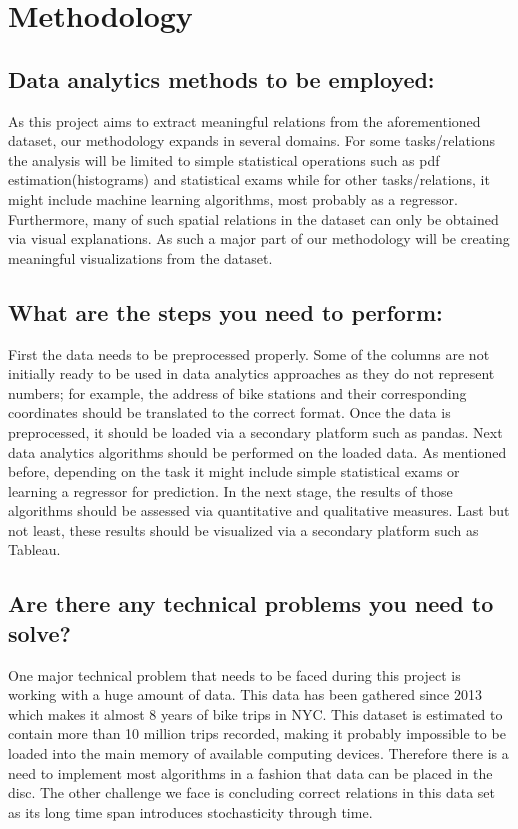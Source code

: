 \documentclass[sigconf,authordraft]{acmart}
\begin{document}
\section{Methodology}


\subsection{Data analytics methods to be employed:} As this project aims to extract meaningful relations from the aforementioned dataset, our methodology expands in several domains. For some tasks/relations the analysis will be limited to simple statistical operations such as pdf estimation(histograms) and statistical exams while for other tasks/relations, it might include machine learning algorithms, most probably as a regressor. Furthermore, many of such spatial relations in the dataset can only be obtained via visual explanations. As such a major part of our methodology will be creating meaningful visualizations from the dataset. \cite{schneider_2015}

\subsection{What are the steps you need to perform:} First the data needs to be preprocessed properly. Some of the columns are not initially ready to be used in data analytics approaches as they do not represent numbers; for example, the address of bike stations and their corresponding coordinates should be translated to the correct format. Once the data is preprocessed, it should be loaded via a secondary platform such as pandas. Next data analytics algorithms should be performed on the loaded data. As mentioned before, depending on the task it might include simple statistical exams or learning a regressor for prediction. In the next stage, the results of those algorithms should be assessed via quantitative and qualitative measures. Last but not least, these results should be visualized via a secondary platform such as Tableau. \cite{rogozhin_2020}

\subsection{Are there any technical problems you need to solve?} One major technical problem that needs to be faced during this project is working with a huge amount of data. This data has been gathered since 2013 which makes it almost 8 years of bike trips in NYC. This dataset is estimated to contain more than 10 million trips recorded, making it probably impossible to be loaded into the main memory of available computing devices. Therefore there is a need to implement most algorithms in a fashion that data can be placed in the disc. The other challenge we face is concluding correct relations in this data set as its long time span introduces stochasticity through time. \cite{yampol_2019} \cite{sinha_2019}
\end{document}
